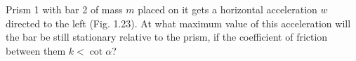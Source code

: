 \item Prism 1 with bar 2 of mass \( m \) placed on it gets a horizontal acceleration \( w \) directed to the left (Fig. 1.23). At what maximum value of this acceleration will the bar be still stationary relative to the prism, if the coefficient of friction between them \( k < \cot \alpha \)?
    \begin{center}
    \end{center}
